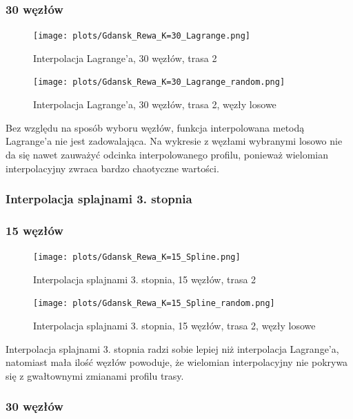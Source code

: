 \documentclass{article}
\begin{document}
\subsubsection*{\hfil 30 węzłów \hfil }

\begin{figure}[H]
    \centering
    \texttt{[image: plots/Gdansk\_Rewa\_K=30\_Lagrange.png]}
    \caption{Interpolacja Lagrange'a, 30 węzłów, trasa 2}
\end{figure}

\begin{figure}[H]
    \centering
    \texttt{[image: plots/Gdansk\_Rewa\_K=30\_Lagrange\_random.png]}
    \caption{Interpolacja Lagrange'a, 30 węzłów, trasa 2, węzły losowe}
\end{figure}

Bez względu na sposób wyboru węzłów, funkcja interpolowana metodą Lagrange'a nie jest zadowalająca.
Na wykresie z węzłami wybranymi losowo nie da się nawet zauważyć odcinka interpolowanego profilu,
ponieważ wielomian interpolacyjny zwraca bardzo chaotyczne wartości.

\subsubsection{Interpolacja splajnami 3. stopnia}

\subsubsection*{\hfil 15 węzłów \hfil }

\begin{figure}[H]
    \centering
    \texttt{[image: plots/Gdansk\_Rewa\_K=15\_Spline.png]}
    \caption{Interpolacja splajnami 3. stopnia, 15 węzłów, trasa 2}
\end{figure}

\begin{figure}[H]
    \centering
    \texttt{[image: plots/Gdansk\_Rewa\_K=15\_Spline\_random.png]}
    \caption{Interpolacja splajnami 3. stopnia, 15 węzłów, trasa 2, węzły losowe}
\end{figure}

Interpolacja splajnami 3. stopnia radzi sobie lepiej niż interpolacja Lagrange'a, 
natomiast mała ilość węzłów powoduje, że wielomian interpolacyjny nie pokrywa się
z gwałtownymi zmianami profilu trasy.

\subsubsection*{\hfil 30 węzłów \hfil }
\end{document}
